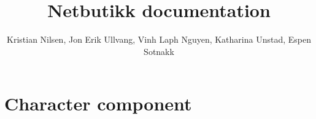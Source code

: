 \documentclass[11pt,a4paper,norsk]{article}
\title{Netbutikk documentation}
\author{Kristian Nilsen, Jon Erik Ullvang, Vinh Laph Nguyen, Katharina Unstad, Espen Sotnakk}
\begin{document}
\maketitle
{}\selectfont
\section*{Character component}
\end{document}
